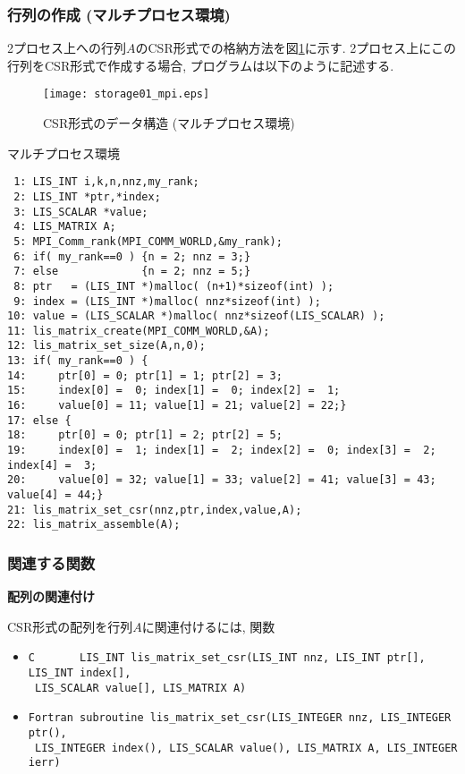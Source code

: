 \documentclass[a4paper]{jarticle}
\begin{document}
{{\subsubsection{行列の作成 (マルチプロセス環境)}
2プロセス上への行列$A$のCSR形式での格納方法を図\ref{fig:storage01_mpi}に示す. 
2プロセス上にこの行列をCSR形式で作成する場合, プログラムは以下のように記述する. 
\begin{figure}[h]
{\centering 
\texttt{[image: storage01\_mpi.eps]} 
\caption{CSR形式のデータ構造 (マルチプロセス環境)}\label{fig:storage01_mpi}}
\end{figure}
\begin{itembox}[l]{マルチプロセス環境}
\small
\begin{verbatim}
 1: LIS_INT i,k,n,nnz,my_rank;
 2: LIS_INT *ptr,*index;
 3: LIS_SCALAR *value;
 4: LIS_MATRIX A;
 5: MPI_Comm_rank(MPI_COMM_WORLD,&my_rank);
 6: if( my_rank==0 ) {n = 2; nnz = 3;}
 7: else             {n = 2; nnz = 5;}
 8: ptr   = (LIS_INT *)malloc( (n+1)*sizeof(int) );
 9: index = (LIS_INT *)malloc( nnz*sizeof(int) );
10: value = (LIS_SCALAR *)malloc( nnz*sizeof(LIS_SCALAR) );
11: lis_matrix_create(MPI_COMM_WORLD,&A);
12: lis_matrix_set_size(A,n,0);
13: if( my_rank==0 ) {
14:     ptr[0] = 0; ptr[1] = 1; ptr[2] = 3;
15:     index[0] =  0; index[1] =  0; index[2] =  1;
16:     value[0] = 11; value[1] = 21; value[2] = 22;}
17: else {
18:     ptr[0] = 0; ptr[1] = 2; ptr[2] = 5;
19:     index[0] =  1; index[1] =  2; index[2] =  0; index[3] =  2; index[4] =  3;
20:     value[0] = 32; value[1] = 33; value[2] = 41; value[3] = 43; value[4] = 44;}
21: lis_matrix_set_csr(nnz,ptr,index,value,A);
22: lis_matrix_assemble(A);
\end{verbatim}
\end{itembox}

\subsubsection{関連する関数}
\noindent
{\bf 配列の関連付け}

CSR形式の配列を行列$A$に関連付けるには, 関数

\begin{itemize}
\item \verb|C       LIS_INT lis_matrix_set_csr(LIS_INT nnz, LIS_INT ptr[], LIS_INT index[],|\\
      \verb| LIS_SCALAR value[], LIS_MATRIX A)|
\item \verb|Fortran subroutine lis_matrix_set_csr(LIS_INTEGER nnz, LIS_INTEGER ptr(),|\\
      \verb| LIS_INTEGER index(), LIS_SCALAR value(), LIS_MATRIX A, LIS_INTEGER ierr)|
\end{itemize}

}}
\end{document}
